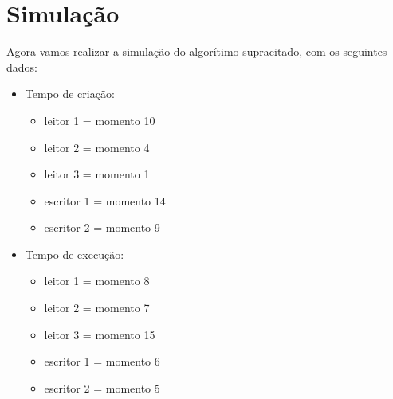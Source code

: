 \documentclass[12pt, a4paper]{article}
\begin{document}
\section{Simulação}

Agora vamos realizar a simulação do algorítimo supracitado, com os seguintes dados:

\begin{multicols}{2}
\begin{itemize}
\footnotesize
	\item Tempo de criação:
	\begin{itemize}
			\item leitor 1 = momento 10
			\item leitor 2 = momento 4
			\item leitor 3 = momento 1
			\item escritor 1 = momento 14
			\item escritor 2 = momento 9
	\end{itemize}
	\item Tempo de execução:
		\begin{itemize}
			\item leitor 1 = momento 8
			\item leitor 2 = momento 7
			\item leitor 3 = momento 15
			\item escritor 1 = momento 6
			\item escritor 2 = momento 5
		\end{itemize}
\end{itemize}
\end{multicols}


\end{document}
